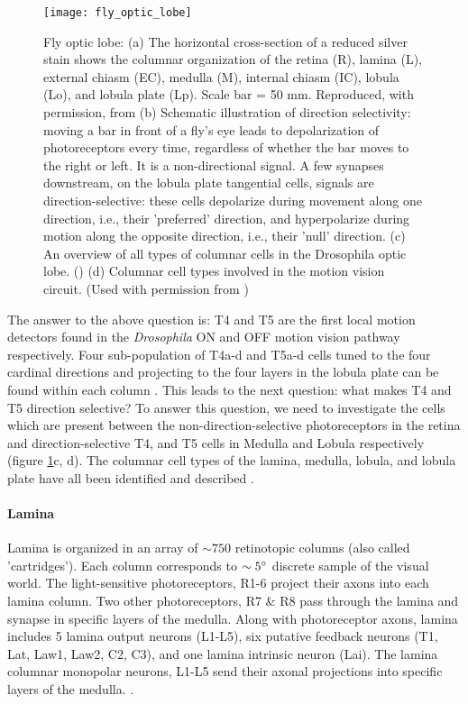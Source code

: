 \begin{figure}
\centering
\hspace*{-1cm} 
\texttt{[image: fly\_optic\_lobe]}
\caption[Fly optic lobe] {Fly optic lobe: (a) The horizontal cross-section of a reduced silver stain shows the columnar organization of the retina (R), lamina (L), external chiasm (EC), medulla (M), internal chiasm (IC), lobula (Lo), and lobula plate (Lp). Scale bar = 50 mm. Reproduced, with permission, from \cite{Takemura2008} (b) Schematic illustration of direction selectivity: moving a bar in front of a fly's eye leads to depolarization of photoreceptors every time, regardless of whether the bar moves to the right or left. It is a non-directional signal. A few synapses downstream, on the lobula plate tangential cells, signals are direction-selective: these cells depolarize during movement along one direction, i.e., their 'preferred' direction, and hyperpolarize during motion along the opposite direction, i.e., their 'null' direction. (c) An overview of all types of columnar cells in the Drosophila optic lobe. (\cite{Fischbach1989}) (d) Columnar cell types involved in the motion vision circuit. (Used with permission from \cite{Borst2020, Borst2020b})}
\label{fig:opticlobe}
\end{figure}

The answer to the above question is: T4 and T5 are the first local motion detectors found in the \textit{Drosophila} ON and OFF motion vision pathway respectively. Four sub-population of T4a-d and T5a-d cells tuned to the four cardinal directions and projecting to the four layers in the lobula plate can be found within each column \parencite{Maisak2013}. This leads to the next question: what makes T4 and T5 direction selective? To answer this question, we need to investigate the cells which are present between the non-direction-selective photoreceptors in the retina and direction-selective T4, and T5 cells in Medulla and Lobula respectively (figure \ref{fig:opticlobe}c, d). The columnar cell types of the lamina, medulla, lobula, and lobula plate have all been identified and described \parencite{Fischbach1989, RamonyCajal1915}.  

\paragraph{Lamina}
Lamina is organized in an array of $\sim 750$ retinotopic columns (also called 'cartridges'). Each column corresponds to $\sim 5\degree$ discrete sample of the visual world. The light-sensitive photoreceptors, R1-6 project their axons into each lamina column. Two other photoreceptors, R7 \& R8 pass through the lamina and synapse in specific layers of the medulla. Along with photoreceptor axons, lamina includes 5 lamina output neurons (L1-L5), six putative feedback neurons (T1, Lat, Law1, Law2, C2, C3), and one lamina intrinsic neuron (Lai). The lamina columnar monopolar neurons, L1-L5 send their axonal projections into specific layers of the medulla. \parencite{Fischbach1989, Tuthill2013}. 

